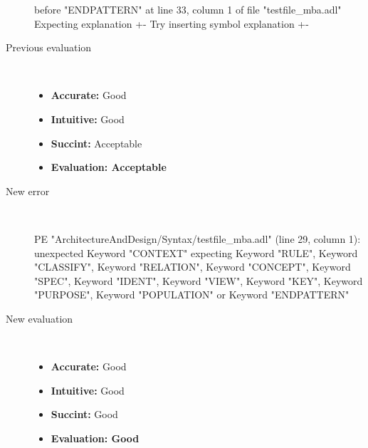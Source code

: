 \begin{description}
\begin{haskell}
before "ENDPATTERN" at line 33, column 1 of file "testfile_mba.adl"
Expecting explanation {+-}
Try inserting symbol explanation {+-}\end{haskell}
  \item[Previous evaluation]~\\
    \begin{itemize}
    \item \textbf{Accurate:} Good
    \item \textbf{Intuitive:} Good
    \item \textbf{Succint:} Acceptable
    \item \textbf{Evaluation: Acceptable}
    \end{itemize}
  \item[New error]~\\
\begin{haskell}
PE "ArchitectureAndDesign/Syntax/testfile_mba.adl" (line 29, column 1):
unexpected Keyword "CONTEXT"
expecting Keyword "RULE", Keyword "CLASSIFY", Keyword "RELATION", Keyword "CONCEPT", Keyword "SPEC", Keyword "IDENT", Keyword "VIEW", Keyword "KEY", Keyword "PURPOSE", Keyword "POPULATION" or Keyword "ENDPATTERN"
\end{haskell}
  \item[New evaluation]~\\
    \begin{itemize}
    \item \textbf{Accurate:} Good
    \item \textbf{Intuitive:} Good
    \item \textbf{Succint:} Good
    \item \textbf{Evaluation: Good
}
    \end{itemize}
  \end{description}

\hrulefill

